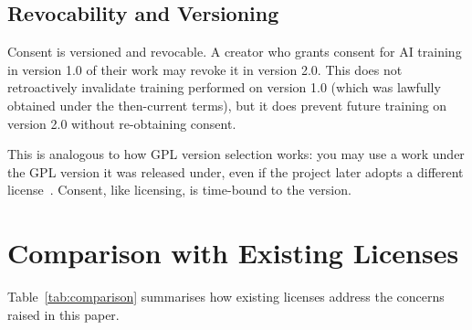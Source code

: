 \documentclass[11pt,twocolumn]{article}
\begin{document}
\subsection{Revocability and Versioning}

Consent is versioned and revocable. A creator who grants consent for
AI training in version 1.0 of their work may revoke it in version 2.0.
This does not retroactively invalidate training performed on version 1.0
(which was lawfully obtained under the then-current terms), but it does
prevent future training on version 2.0 without re-obtaining consent.

This is analogous to how GPL version selection works: you may use a work
under the GPL version it was released under, even if the project later
adopts a different license~\cite{gplv3}. Consent, like licensing, is
time-bound to the version.

\section{Comparison with Existing Licenses}
\label{sec:comparison}

Table~\ref{tab:comparison} summarises how existing licenses address the
concerns raised in this paper.
\end{document}
